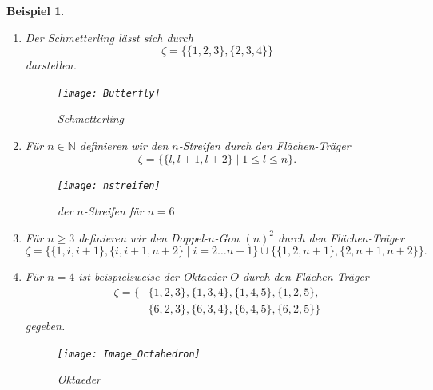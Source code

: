 \documentclass[12pt,titlepage,twoside,cleardoublepage]{article}
\theoremstyle{nummermitklammern}
\newtheorem{bsp}[temp]{Beispiel}
\newtheorem{definition}[temp]{Definition}
\newtheorem{definition}[zahl]{Definition}
\newtheorem{bsp}[zahl]{Beispiel}
\numberwithin{equation}{section}
\begin{document}
\begin{bsp} \label{bspO}
\begin{enumerate}
Der Flächen-Träger 
\[
\zeta=\{\{1,2,3\},\{1,3,4\},\{1,2,4\},\{2,3,4\}\}
\]
bildet eine getragene simpliziale Fläche, die zu einem Tetraeder isomorph ist.
\item Der Schmetterling lässt sich durch 
\[
\zeta =\{\{1,2,3\},\{2,3,4\}\}
\] darstellen.
\begin{figure}[H]
\begin{center}
\texttt{[image: Butterfly]}
\end{center}
\caption{Schmetterling}
\end{figure}
\item
Für $n\in \mathbb{N}$ definieren wir den \emph{$n$-Streifen} durch den Flächen-Träger
\[
\zeta=\{\{l,l+1,l+2\}\mid 1\leq l \leq n\}.
\]
\begin{figure}[H]
\begin{center}
\texttt{[image: nstreifen]}
\end{center}
\caption{der $n$-Streifen für $n=6$}
\end{figure}
\item 
Für $n\geq 3$ definieren wir den Doppel-$n$-Gon $(n)^2$ durch den Flächen-Träger  
\[
\zeta=\{\{1,i,i+1\},\{i,i+1,n+2\}\mid i=2\ldots n-1\}\cup \{\{1,2,n+1\},\{2,n+1,n+2\}\}.
\]  
\item
Für $n=4$ ist beispielsweise der Oktaeder $O$ durch den  Flächen-Träger
\begin{align*}
\zeta=\{&\{1,2,3\},\{1,3,4\},\{1,4,5\},\{1,2,5\},\\
&\{6,2,3\},\{6,3,4\},\{6,4,5\},\{6,2,5\}\}
\end{align*} 
gegeben.
\begin{figure}[H]
\begin{center}
\texttt{[image: Image\_Octahedron]}
\end{center}
\caption{Oktaeder}
\end{figure} 
\end{enumerate}
\end{bsp}

\end{document}
